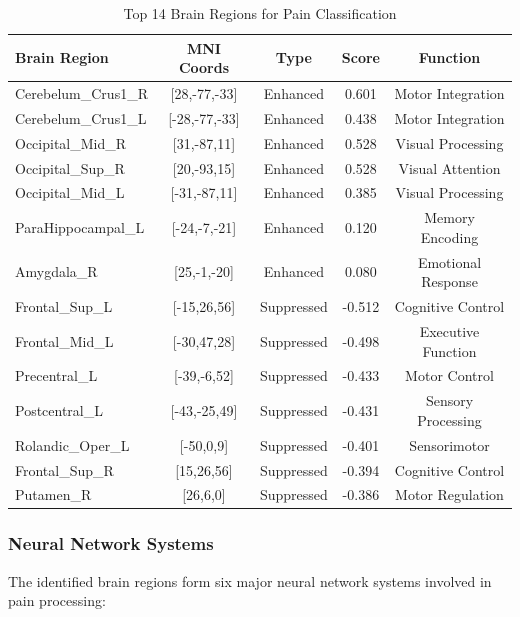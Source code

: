 \documentclass[10pt,journal,compsoc]{IEEEtran}
\begin{document}
\begin{table}[htbp]
\caption{Top 14 Brain Regions for Pain Classification}
\label{tab:brain_regions}
\centering
\small
\begin{tabular}{lcccc}
\toprule
Brain Region & MNI Coords & Type & Score & Function \\
\midrule
Cerebelum\_Crus1\_R & [28,-77,-33] & Enhanced & 0.601 & Motor Integration \\
Cerebelum\_Crus1\_L & [-28,-77,-33] & Enhanced & 0.438 & Motor Integration \\
Occipital\_Mid\_R & [31,-87,11] & Enhanced & 0.528 & Visual Processing \\
Occipital\_Sup\_R & [20,-93,15] & Enhanced & 0.528 & Visual Attention \\
Occipital\_Mid\_L & [-31,-87,11] & Enhanced & 0.385 & Visual Processing \\
ParaHippocampal\_L & [-24,-7,-21] & Enhanced & 0.120 & Memory Encoding \\
Amygdala\_R & [25,-1,-20] & Enhanced & 0.080 & Emotional Response \\
Frontal\_Sup\_L & [-15,26,56] & Suppressed & -0.512 & Cognitive Control \\
Frontal\_Mid\_L & [-30,47,28] & Suppressed & -0.498 & Executive Function \\
Precentral\_L & [-39,-6,52] & Suppressed & -0.433 & Motor Control \\
Postcentral\_L & [-43,-25,49] & Suppressed & -0.431 & Sensory Processing \\
Rolandic\_Oper\_L & [-50,0,9] & Suppressed & -0.401 & Sensorimotor \\
Frontal\_Sup\_R & [15,26,56] & Suppressed & -0.394 & Cognitive Control \\
Putamen\_R & [26,6,0] & Suppressed & -0.386 & Motor Regulation \\
\bottomrule
\end{tabular}
\end{table}

\subsubsection{Neural Network Systems}

The identified brain regions form six major neural network systems involved in pain processing:
\end{document}
